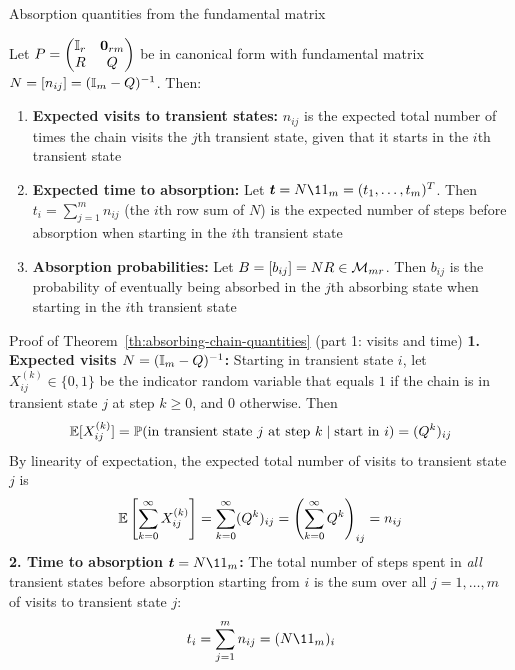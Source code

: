 \documentclass[aspectratio=169]{beamer}\usepackage[]{graphicx}\usepackage[]{xcolor}
\providecommand{\bt}{\bm{t}}
\begin{document}
\begin{frame}{Absorption quantities from the fundamental matrix}
\begin{theorem}
\label{th:absorbing-chain-quantities}
Let $P = \begin{pmatrix} \II_r & \b0_{rm} \\ R & Q \end{pmatrix}$ be in canonical form with fundamental matrix $N = [n_{ij}] = (\mathbb{I}_m - Q)^{-1}$. Then:
\begin{enumerate}
\item \textbf{Expected visits to transient states:} $n_{ij}$ is the expected total number of times the chain visits the $j$th transient state, given that it starts in the $i$th transient state
\item \textbf{Expected time to absorption:} Let $\bt = N\11_m = (t_1, \ldots, t_m)^T$. Then $t_i = \sum_{j=1}^m n_{ij}$ (the $i$th row sum of $N$) is the expected number of steps before absorption when starting in the $i$th transient state
\item \textbf{Absorption probabilities:} Let $B = [b_{ij}] = N R \in \mathcal{M}_{mr}$. Then $b_{ij}$ is the probability of eventually being absorbed in the $j$th absorbing state when starting in the $i$th transient state
\end{enumerate}
\end{theorem}
\end{frame}

\begin{frame}{Proof of Theorem~\ref{th:absorbing-chain-quantities} (part 1: visits and time)}
\textbf{1. Expected visits $N = (\mathbb{I}_m - Q)^{-1}$:} Starting in transient state $i$, let $X_{ij}^{(k)} \in \{0,1\}$ be the indicator random variable that equals $1$ if the chain is in transient state $j$ at step $k \ge 0$, and $0$ otherwise. Then
\[
\mathbb{E}[X_{ij}^{(k)}] = \mathbb{P}(\text{in transient state } j \text{ at step } k \mid \text{start in } i) = (Q^k)_{ij}
\]
By linearity of expectation, the expected total number of visits to transient state $j$ is
\[
\mathbb{E}\left[\sum_{k=0}^\infty X_{ij}^{(k)}\right] = \sum_{k=0}^\infty (Q^k)_{ij} = \left(\sum_{k=0}^\infty Q^k\right)_{ij} = n_{ij}
\]
\vfill
\textbf{2. Time to absorption $\bt = N\11_m$:} The total number of steps spent in \emph{all} transient states before absorption starting from $i$ is the sum over all $j=1,\ldots,m$ of visits to transient state $j$:
\[
t_i = \sum_{j=1}^m n_{ij} = (N\11_m)_i
\]
\end{frame}
\end{document}
